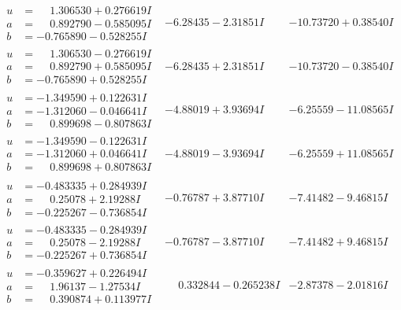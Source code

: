 \documentclass[1p]{elsarticle_modified}
\theoremstyle{definition}
\begin{document}
$$\begin{array}{c|c|c}
\begin{aligned}
u &= \phantom{-}1.306530 + 0.276619 I \\
a &= \phantom{-}0.892790 - 0.585095 I \\
b &= -0.765890 - 0.528255 I\end{aligned}
 & -6.28435 - 2.31851 I & -10.73720 + 0.38540 I \\ \hline\begin{aligned}
u &= \phantom{-}1.306530 - 0.276619 I \\
a &= \phantom{-}0.892790 + 0.585095 I \\
b &= -0.765890 + 0.528255 I\end{aligned}
 & -6.28435 + 2.31851 I & -10.73720 - 0.38540 I \\ \hline\begin{aligned}
u &= -1.349590 + 0.122631 I \\
a &= -1.312060 - 0.046641 I \\
b &= \phantom{-}0.899698 - 0.807863 I\end{aligned}
 & -4.88019 + 3.93694 I & -6.25559 - 11.08565 I \\ \hline\begin{aligned}
u &= -1.349590 - 0.122631 I \\
a &= -1.312060 + 0.046641 I \\
b &= \phantom{-}0.899698 + 0.807863 I\end{aligned}
 & -4.88019 - 3.93694 I & -6.25559 + 11.08565 I \\ \hline\begin{aligned}
u &= -0.483335 + 0.284939 I \\
a &= \phantom{-}0.25078 + 2.19288 I \\
b &= -0.225267 - 0.736854 I\end{aligned}
 & -0.76787 + 3.87710 I & -7.41482 - 9.46815 I \\ \hline\begin{aligned}
u &= -0.483335 - 0.284939 I \\
a &= \phantom{-}0.25078 - 2.19288 I \\
b &= -0.225267 + 0.736854 I\end{aligned}
 & -0.76787 - 3.87710 I & -7.41482 + 9.46815 I \\ \hline\begin{aligned}
u &= -0.359627 + 0.226494 I \\
a &= \phantom{-}1.96137 - 1.27534 I \\
b &= \phantom{-}0.390874 + 0.113977 I\end{aligned}
 & \phantom{-}0.332844 - 0.265238 I & -2.87378 - 2.01816 I \\ \hline\begin{aligned}

\end{aligned}
\end{array}$$
\end{document}
